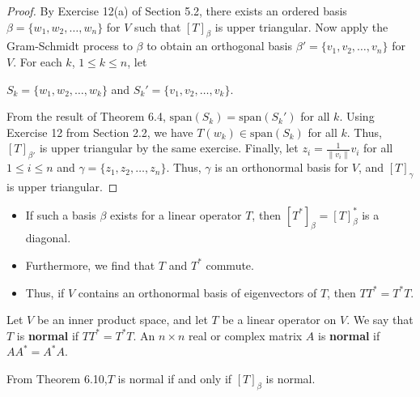 \begin{proof}
By Exercise 12(a) of Section 5.2, there exists an ordered basis \( \beta = \{ {w}_{1}, {w}_{2}, \dots, {w}_{n} \}  \) for \( V  \) such that \( [T]_{\beta} \) is upper triangular. Now apply the Gram-Schmidt process to \( \beta  \) to obtain an orthogonal basis \( \beta' = \{ {v}_{1}, {v}_{2}, \dots, {v}_{n} \}  \) for \( V  \). For each \( k  \), \( 1 \leq k \leq n  \), let 
\begin{center}
    \( {S}_{k} = \{ {w}_{1}, {w}_{2}, \dots, {w}_{k } \}   \) and  \( {S}_{k}' = \{ {v}_{1}, {v}_{2}, \dots, {v}_{k} \}. \)
\end{center}
From the result of Theorem 6.4, \( \text{span}({S}_{k}) = \text{span}({S}_{k}') \) for all \( k  \). Using Exercise 12 from Section 2.2, we have \( T({w}_{k}) \in \text{span}({S}_{k}) \) for all \(  k  \). Thus, \( [T]_{\beta'} \) is upper triangular by the same exercise. Finally, let \( {z}_{i}  = \frac{ 1 }{ \|{v}_{i}\| }  {v}_{i} \) for all \( 1 \leq i \leq n  \) and \( \gamma = \{ {z}_{1}, {z}_{2}, \dots, {z}_{n} \}  \). Thus, \( \gamma  \) is an orthonormal basis for \( V  \), and \( [T]_{\gamma}  \) is upper triangular.
\end{proof}

\begin{itemize}
    \item If such a basis \( \beta \) exists for a linear operator \( T  \), then \( [T^{*}]_{\beta} = [T]_{\beta}^{*} \) is a diagonal.
    \item Furthermore, we find that \( T  \) and \( T^{*} \) commute.
    \item Thus, if \( V  \) contains an orthonormal basis of eigenvectors of \( T  \), then \( T T^{*} = T^{*} T  \).
\end{itemize}

\begin{definition}[Normal]
    Let \( V  \) be an inner product space, and let \( T  \) be a linear operator on \( V  \). We say that \( T  \) is \textbf{normal} if \( T T^{*} = T^{*} T  \). An \( n \times n  \) real or complex matrix \( A  \) is \textbf{normal} if \( A A^{*} = A^{*} A  \).
\end{definition}

\begin{remark}
   From Theorem 6.10,\( T  \) is normal if and only if \( [T]_{\beta} \) is normal.
\end{remark}

